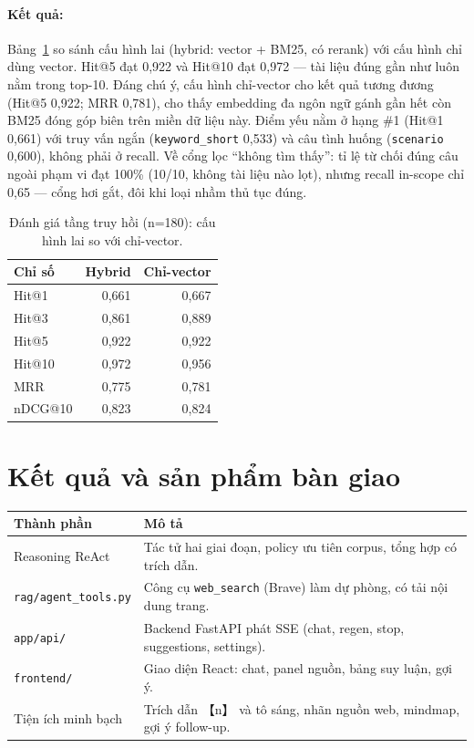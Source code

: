 \documentclass[11pt]{article}
\begin{document}
\paragraph{Kết quả: }
Bảng~\ref{tab:w3-retr} so sánh cấu hình lai (hybrid: vector + BM25, có rerank) với cấu hình chỉ
dùng vector. Hit@5 đạt 0,922 và Hit@10 đạt 0,972 --- tài liệu đúng gần như luôn nằm trong
top-10. Đáng chú ý, cấu hình chỉ-vector cho kết quả tương đương (Hit@5 0,922; MRR 0,781), cho
thấy embedding đa ngôn ngữ gánh gần hết còn BM25 đóng góp biên trên miền dữ liệu này. Điểm yếu
nằm ở hạng \#1 (Hit@1 0,661) với truy vấn ngắn (\texttt{keyword\_short} 0,533) và câu tình
huống (\texttt{scenario} 0,600), không phải ở recall. Về cổng lọc ``không tìm thấy'': tỉ lệ từ
chối đúng câu ngoài phạm vi đạt 100\% (10/10, không tài liệu nào lọt), nhưng recall in-scope
chỉ 0,65 --- cổng hơi gắt, đôi khi loại nhầm thủ tục đúng.

\begin{table}[H]
\centering\small
\renewcommand{\arraystretch}{1.2}
\begin{tabular}{@{}lrr@{}}
\toprule
Chỉ số & Hybrid & Chỉ-vector \\
\midrule
Hit@1 & 0,661 & 0,667 \\
Hit@3 & 0,861 & 0,889 \\
Hit@5 & 0,922 & 0,922 \\
Hit@10 & 0,972 & 0,956 \\
MRR & 0,775 & 0,781 \\
nDCG@10 & 0,823 & 0,824 \\
\bottomrule
\end{tabular}
\caption{Đánh giá tầng truy hồi (n=180): cấu hình lai so với chỉ-vector.}
\label{tab:w3-retr}
\end{table}

\section{Kết quả và sản phẩm bàn giao}
\begin{table}[H]
\centering\small
\begin{tabular}{@{}lp{8.7cm}@{}}
\toprule
Thành phần & Mô tả \\
\midrule
Reasoning ReAct & Tác tử hai giai đoạn, policy ưu tiên corpus, tổng hợp có trích dẫn. \\
\texttt{rag/agent\_tools.py} & Công cụ \texttt{web\_search} (Brave) làm dự phòng, có tải nội dung trang. \\
\texttt{app/api/} & Backend FastAPI phát SSE (chat, regen, stop, suggestions, settings). \\
\texttt{frontend/} & Giao diện React: chat, panel nguồn, bảng suy luận, gợi ý. \\
Tiện ích minh bạch & Trích dẫn 【n】 và tô sáng, nhãn nguồn web, mindmap, gợi ý follow-up. \\
\bottomrule
\end{tabular}
\end{table}
\end{document}
